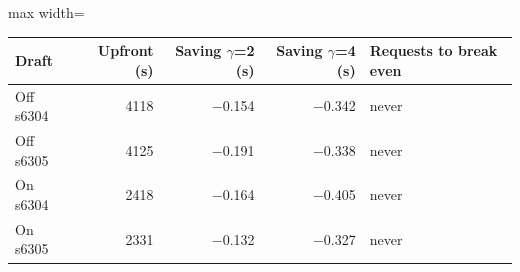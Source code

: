 \scriptsize
\setlength{\tabcolsep}{3.5pt}
\label{tab:t3deploy}
\begin{adjustbox}{max width=\linewidth}
\begin{tabular}{lrrrl}
\toprule
Draft & Upfront (s) & Saving $\gamma$=2 (s) & Saving $\gamma$=4 (s) & Requests to break even \\
\midrule
Off s6304 & 4118 & $-$0.154 & $-$0.342 & never \\
Off s6305 & 4125 & $-$0.191 & $-$0.338 & never \\
On s6304 & 2418 & $-$0.164 & $-$0.405 & never \\
On s6305 & 2331 & $-$0.132 & $-$0.327 & never \\
\bottomrule
\end{tabular}
\end{adjustbox}
